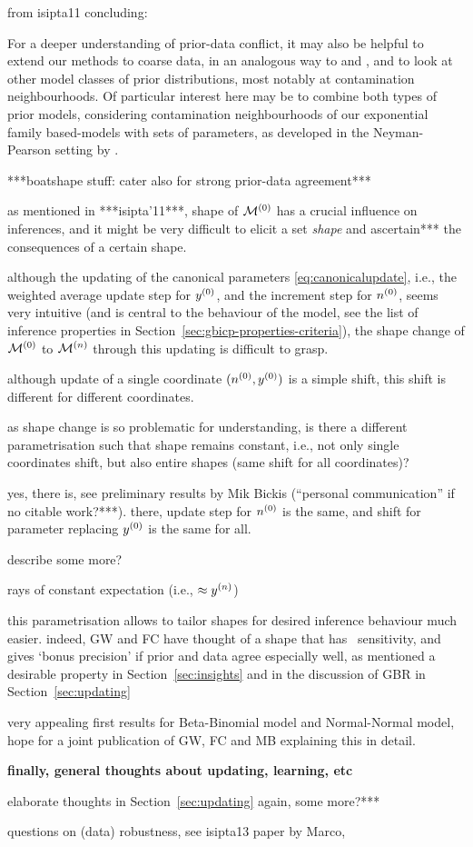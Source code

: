 from isipta11 concluding:
\begin{small}
For a deeper understanding of prior-data conflict, it may also be helpful
to extend our methods to coarse data, in an analogous way to \textcite{2007:utkinaugustin} and
\textcite{2009:Troffaes:Coolen}, and to look at other model classes of prior distributions, most
notably at contamination neighbourhoods. Of particular interest here may
be to combine both types of prior models, considering contamination
neighbourhoods of our exponential family based-models with sets of
parameters, as developed in the Neyman-Pearson setting by
\textcite[\S~5]{2002:augustin}.
\end{small}


***boatshape stuff: cater also for strong prior-data agreement***

as mentioned in ***isipta'11***, shape of $\mathcal{M}^{(0)}$ has a crucial influence on inferences,
and it might be very difficult to elicit a set \emph{shape} and ascertain*** the consequences of a certain shape.

although the updating of the canonical parameters \eqref{eq:canonicalupdate},
i.e., the weighted average update step for $y^{(0)}$, and the increment step for $n^{(0)}$,
seems very intuitive (and is central to the behaviour of the model,
see the list of inference properties in Section~\ref{sec:gbicp-properties-criteria}),
the shape change of $\mathcal{M}^{(0)}$ to $\mathcal{M}^{(n)}$ through this updating is difficult to grasp.

although update of a single coordinate $(n^{(0)},y^{(0)})$ is a simple shift,
this shift is different for different coordinates.

as shape change is so problematic for understanding,
is there a different parametrisation such that shape remains constant,
i.e., not only single coordinates shift, but also entire shapes
(same shift for all coordinates)?

yes, there is, see preliminary results by Mik Bickis (``personal communication'' if no citable work?***).
there, update step for $n^{(0)}$ is the same, and shift for parameter replacing $y^{(0)}$ is the same for all. 

describe some more?

rays of constant expectation (i.e., $\approx y^{(n)}$)

this parametrisation allows to tailor shapes for desired inference behaviour much easier.
indeed, GW and FC have thought of a shape that has \pdc\ sensitivity,
and gives `bonus precision' if prior and data agree especially well,
as mentioned a desirable property in Section~\ref{sec:insights}
and in the discussion of GBR in Section~\ref{sec:updating}

very appealing first results for Beta-Binomial model and Normal-Normal model,
hope for a joint publication of GW, FC and MB explaining this in detail.


\textbf{finally, general thoughts about updating, learning, etc}

elaborate thoughts in Section~\ref{sec:updating} again, some more?***

questions on (data) robustness, see isipta13 paper by Marco,


